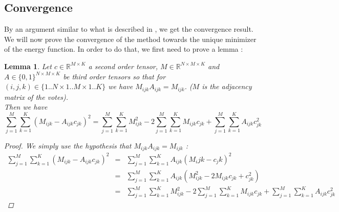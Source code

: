 \documentclass[12pt,a4paper]{article}
\newtheorem{lemma}{Lemma}
\begin{document}
\subsection{Convergence}
By an argument similar to what is described in \cite{Cristo1}, we get the convergence result.
We will now prove the convergence of the method towards the unique minimizer of the energy function. In order to do that, we first need to prove a lemma :
\begin{lemma}
Let $c\in \mathbb{R}^{M \times K}$ a second order tensor, $M\in \mathbb{R}^{N\times M \times K}$ and $A\in \{0,1\}^{N\times M \times K}$ be third order tensors so that for $(i,j,k) \in \{1..N \times 1..M \times 1..K \}$ we have $M_{ijk} A_{ijk} = M_{ijk}$. ($M$ is the adjacency matrix of the votes).\\
Then we have 
$$\sum_{j=1}^M \sum_{k=1}^K (M_{ijk}-A_{ijk} c_{jk})^2 = \sum_{j=1}^M \sum_{k=1}^K M_{ijk}^2 - 2\sum_{j=1}^M \sum_{k=1}^K M_{ijk}c_{jk} + \sum_{j=1}^M \sum_{k=1}^K A_{ijk} c_{jk}^2$$

\begin{proof}
We simply use the hypothesis that $M_{ijk}A_{ijk} = M_{ijk}$ :
\begin{eqnarray*}
\sum_{j=1}^M \sum_{k=1}^K (M_{ijk}-A_{ijk} c_{jk})^2 & = & \sum_{j=1}^M \sum_{k=1}^K A_{ijk}(M_ijk-c_jk)^2 \\
& = & \sum_{j=1}^M \sum_{k=1}^K A_{ijk} (M_{ijk}^2 - 2 M_{ijk}c_{jk} + c_{jk}^2)\\
& = & \sum_{j=1}^M \sum_{k=1}^K M_{ijk}^2 - 2\sum_{j=1}^M \sum_{k=1}^K M_{ijk}c_{jk} + \sum_{j=1}^M \sum_{k=1}^K A_{ijk} c_{jk}^2
\end{eqnarray*}
\end{proof}
\label{lemma:tens}
\end{lemma}
\end{document}
